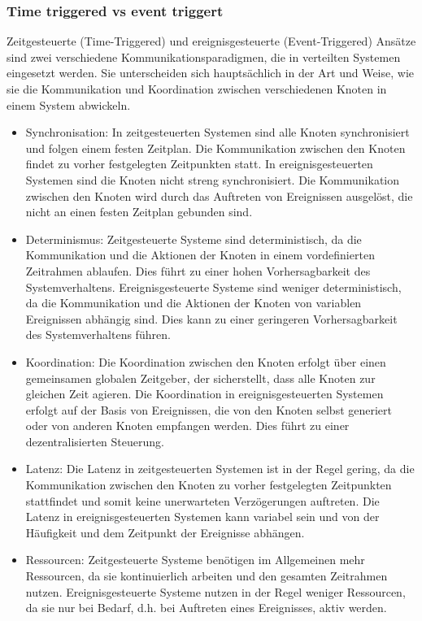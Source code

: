 \subsubsection{Time triggered vs event triggert}
Zeitgesteuerte (Time-Triggered) und ereignisgesteuerte (Event-Triggered) Ansätze sind zwei verschiedene Kommunikationsparadigmen, die in verteilten Systemen eingesetzt werden. Sie unterscheiden sich hauptsächlich in der Art und Weise, wie sie die Kommunikation und Koordination zwischen verschiedenen Knoten in einem System abwickeln.
\begin{itemize}
\item Synchronisation: In zeitgesteuerten Systemen sind alle Knoten synchronisiert und folgen einem festen Zeitplan. Die Kommunikation zwischen den Knoten findet zu vorher festgelegten Zeitpunkten statt. In ereignisgesteuerten Systemen sind die Knoten nicht streng synchronisiert. Die Kommunikation zwischen den Knoten wird durch das Auftreten von Ereignissen ausgelöst, die nicht an einen festen Zeitplan gebunden sind.
\item Determinismus: Zeitgesteuerte Systeme sind deterministisch, da die Kommunikation und die Aktionen der Knoten in einem vordefinierten Zeitrahmen ablaufen. Dies führt zu einer hohen Vorhersagbarkeit des Systemverhaltens. Ereignisgesteuerte Systeme sind weniger deterministisch, da die Kommunikation und die Aktionen der Knoten von variablen Ereignissen abhängig sind. Dies kann zu einer geringeren Vorhersagbarkeit des Systemverhaltens führen.
\item Koordination: Die Koordination zwischen den Knoten erfolgt über einen gemeinsamen globalen Zeitgeber, der sicherstellt, dass alle Knoten zur gleichen Zeit agieren. Die Koordination in ereignisgesteuerten Systemen erfolgt auf der Basis von Ereignissen, die von den Knoten selbst generiert oder von anderen Knoten empfangen werden. Dies führt zu einer dezentralisierten Steuerung.
\item Latenz: Die Latenz in zeitgesteuerten Systemen ist in der Regel gering, da die Kommunikation zwischen den Knoten zu vorher festgelegten Zeitpunkten stattfindet und somit keine unerwarteten Verzögerungen auftreten. Die Latenz in ereignisgesteuerten Systemen kann variabel sein und von der Häufigkeit und dem Zeitpunkt der Ereignisse abhängen.
\item Ressourcen: Zeitgesteuerte Systeme benötigen im Allgemeinen mehr Ressourcen, da sie kontinuierlich arbeiten und den gesamten Zeitrahmen nutzen. Ereignisgesteuerte Systeme nutzen in der Regel weniger Ressourcen, da sie nur bei Bedarf, d.h. bei Auftreten eines Ereignisses, aktiv werden.
\end{itemize}

